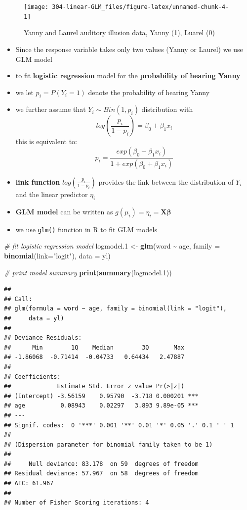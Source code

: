 \documentclass[
]{book}
\newenvironment{Shaded}{\begin{snugshade}}{\end{snugshade}}
\newcommand{\CommentTok}[1]{\textcolor[rgb]{0.56,0.35,0.01}{\textit{#1}}}
\newcommand{\DataTypeTok}[1]{\textcolor[rgb]{0.13,0.29,0.53}{#1}}
\newcommand{\FloatTok}[1]{\textcolor[rgb]{0.00,0.00,0.81}{#1}}
\newcommand{\KeywordTok}[1]{\textcolor[rgb]{0.13,0.29,0.53}{\textbf{#1}}}
\newcommand{\NormalTok}[1]{#1}
\newcommand{\OperatorTok}[1]{\textcolor[rgb]{0.81,0.36,0.00}{\textbf{#1}}}
\newcommand{\StringTok}[1]{\textcolor[rgb]{0.31,0.60,0.02}{#1}}
\providecommand{\tightlist}{%
  \setlength{\itemsep}{0pt}\setlength{\parskip}{0pt}}
\theoremstyle{definition}
\theoremstyle{definition}
\theoremstyle{definition}
\theoremstyle{remark}
\begin{document}
\begin{figure}

{\centering \texttt{[image: 304-linear-GLM\_files/figure-latex/unnamed-chunk-4-1]} 

}

\caption{Yanny and Laurel auditory illusion data, Yanny (1), Luarel (0)}\label{fig:unnamed-chunk-4}
\end{figure}

\begin{itemize}
\tightlist
\item
  Since the response variable takes only two values (Yanny or Laurel) we use GLM model
\item
  to fit \textbf{logistic regression} model for the \textbf{probability of hearing Yanny}
\item
  we let \(p_i=P(Y_i=1)\) denote the probability of hearing Yanny
\item
  we further assume that \(Y_i \sim Bin(1, p_i)\) distribution with
  \[log(\frac{p_i}{1-p_i})=\beta_0 + \beta_1x_i\]
  this is equivalent to:
  \[p_i = \frac{exp(\beta_0 + \beta_1x_i)}{1 + exp(\beta_0 + \beta_1x_i)}\]
\item
  \textbf{link function} \(log(\frac{p_i}{1-p_i})\) provides the link between the distribution of \(Y_i\) and the linear predictor \(\eta_i\)
\item
  \textbf{GLM model} can be written as \(g(\mu_i)=\eta_i = \mathbf{X}\boldsymbol\beta\)
\item
  we use \texttt{glm()} function in R to fit GLM models
\end{itemize}

\begin{Shaded}
\begin{Highlighting}[]
\CommentTok{\# fit logistic regression model}
\NormalTok{logmodel}\FloatTok{.1}\NormalTok{ \textless{}{-}}\StringTok{ }\KeywordTok{glm}\NormalTok{(word }\OperatorTok{\textasciitilde{}}\StringTok{ }\NormalTok{age, }\DataTypeTok{family =} \KeywordTok{binomial}\NormalTok{(}\DataTypeTok{link=}\StringTok{"logit"}\NormalTok{), }\DataTypeTok{data =}\NormalTok{ yl)}

\CommentTok{\# print model summary}
\KeywordTok{print}\NormalTok{(}\KeywordTok{summary}\NormalTok{(logmodel}\FloatTok{.1}\NormalTok{))}
\end{Highlighting}
\end{Shaded}

\begin{verbatim}
## 
## Call:
## glm(formula = word ~ age, family = binomial(link = "logit"), 
##     data = yl)
## 
## Deviance Residuals: 
##      Min        1Q    Median        3Q       Max  
## -1.86068  -0.71414  -0.04733   0.64434   2.47887  
## 
## Coefficients:
##             Estimate Std. Error z value Pr(>|z|)    
## (Intercept) -3.56159    0.95790  -3.718 0.000201 ***
## age          0.08943    0.02297   3.893 9.89e-05 ***
## ---
## Signif. codes:  0 '***' 0.001 '**' 0.01 '*' 0.05 '.' 0.1 ' ' 1
## 
## (Dispersion parameter for binomial family taken to be 1)
## 
##     Null deviance: 83.178  on 59  degrees of freedom
## Residual deviance: 57.967  on 58  degrees of freedom
## AIC: 61.967
## 
## Number of Fisher Scoring iterations: 4
\end{verbatim}
\end{document}
